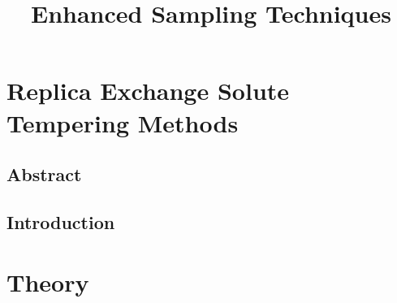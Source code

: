 \documentclass{memoir}
\title{Enhanced Sampling Techniques}
\begin{document}
\date{}

\maketitle

\tableofcontents

\chapter{Replica Exchange Solute Tempering Methods}
\section{Abstract}


\section{Introduction}

  
\chapter{Theory} 




\end{document}

